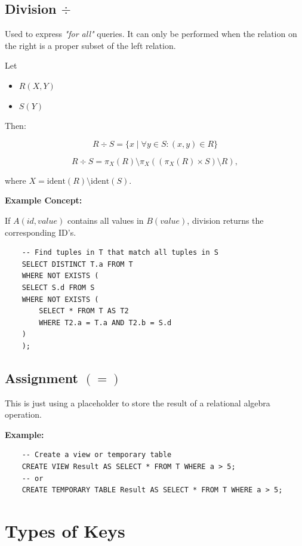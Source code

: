 \subsection{Division \texorpdfstring{\(\div\)}{}}

Used to express \emph{"for all"} queries. It can only be performed when 
the relation on the right is a proper subset of the left relation.

Let

\begin{itemize}
    \item \(R(X, Y)\)
    
    \item \(S(Y)\)
\end{itemize}

Then:

\[
    R \div S = \{x \mid \forall y \in S: (x, y) \in R\}
\]

\[
    R \div S = \pi_{X}(R) \setminus \pi_{X}\left((\pi_{X}(R) \times S) \setminus R\right),
\]

where \(X = \mathrm{ident}(R) \setminus \mathrm{ident}(S)\).

\textbf{Example Concept:}  

If \(A(id, value)\) contains all values in \(B(value)\), division returns the corresponding ID's.

\begin{verbatim}
    -- Find tuples in T that match all tuples in S
    SELECT DISTINCT T.a FROM T 
    WHERE NOT EXISTS (
    SELECT S.d FROM S 
    WHERE NOT EXISTS (
        SELECT * FROM T AS T2 
        WHERE T2.a = T.a AND T2.b = S.d
    )
    );
\end{verbatim}

\subsection{Assignment \texorpdfstring{\((=)\)}{}}

This is just using a placeholder to store the result of a relational algebra operation.

\textbf{Example:}

\begin{verbatim}
    -- Create a view or temporary table
    CREATE VIEW Result AS SELECT * FROM T WHERE a > 5;
    -- or
    CREATE TEMPORARY TABLE Result AS SELECT * FROM T WHERE a > 5;
\end{verbatim}

\section{Types of Keys}

